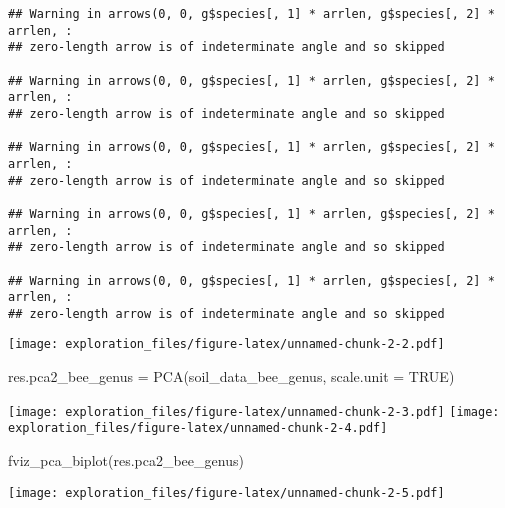 \documentclass[
]{article}
\newenvironment{Shaded}{\begin{snugshade}}{\end{snugshade}}
\newcommand{\AttributeTok}[1]{\textcolor[rgb]{0.77,0.63,0.00}{#1}}
\newcommand{\ConstantTok}[1]{\textcolor[rgb]{0.00,0.00,0.00}{#1}}
\newcommand{\FunctionTok}[1]{\textcolor[rgb]{0.00,0.00,0.00}{#1}}
\newcommand{\NormalTok}[1]{#1}
\newcommand{\OtherTok}[1]{\textcolor[rgb]{0.56,0.35,0.01}{#1}}
\begin{document}
\begin{verbatim}
## Warning in arrows(0, 0, g$species[, 1] * arrlen, g$species[, 2] * arrlen, :
## zero-length arrow is of indeterminate angle and so skipped

## Warning in arrows(0, 0, g$species[, 1] * arrlen, g$species[, 2] * arrlen, :
## zero-length arrow is of indeterminate angle and so skipped

## Warning in arrows(0, 0, g$species[, 1] * arrlen, g$species[, 2] * arrlen, :
## zero-length arrow is of indeterminate angle and so skipped

## Warning in arrows(0, 0, g$species[, 1] * arrlen, g$species[, 2] * arrlen, :
## zero-length arrow is of indeterminate angle and so skipped

## Warning in arrows(0, 0, g$species[, 1] * arrlen, g$species[, 2] * arrlen, :
## zero-length arrow is of indeterminate angle and so skipped
\end{verbatim}

\texttt{[image: exploration\_files/figure-latex/unnamed-chunk-2-2.pdf]}

\begin{Shaded}
\begin{Highlighting}[]
\NormalTok{res.pca2\_bee\_genus }\OtherTok{=} \FunctionTok{PCA}\NormalTok{(soil\_data\_bee\_genus, }\AttributeTok{scale.unit =} \ConstantTok{TRUE}\NormalTok{)}
\end{Highlighting}
\end{Shaded}

\texttt{[image: exploration\_files/figure-latex/unnamed-chunk-2-3.pdf]}
\texttt{[image: exploration\_files/figure-latex/unnamed-chunk-2-4.pdf]}

\begin{Shaded}
\begin{Highlighting}[]
\FunctionTok{fviz\_pca\_biplot}\NormalTok{(res.pca2\_bee\_genus)}
\end{Highlighting}
\end{Shaded}

\texttt{[image: exploration\_files/figure-latex/unnamed-chunk-2-5.pdf]}
\end{document}
